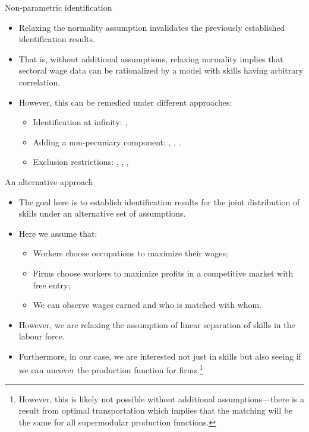 \documentclass{beamer}
\begin{document}
	\begin{frame}{Non-parametric identification}
		\begin{itemize}
			\item Relaxing the normality assumption invalidates the previously established identification results. \citep{heckman1990empirical}
			\smallskip
			\item That is, without additional assumptions, relaxing normality implies that sectoral wage data can be rationalized by a model with skills having arbitrary correlation.
			\smallskip
			\item However, this can be remedied under different approaches:
			\begin{itemize}
				\smallskip
				\item Identification at infinity: \citet{heckman1990empirical} \citet{french2011identification}, \citet{d2013another}
				\smallskip
				\item Adding a non-pecuniary component: \citet{heckman2007econometric} \citet{d2013inference}, \citet{bayer2011nonparametric}, \citet{lee2023nonparametric}.
				\smallskip
				\item Exclusion restrictions: \citet{heckman1990empirical}, \citet{buera2006non}, \citet{french2011identification}, \citet{mourifie2020sharp}
			\end{itemize}
		\end{itemize}
	\end{frame}
	
	\begin{frame}{An alternative approach}
		\begin{itemize}
			\item The goal here is to establish identification results for the joint distribution of skills under an alternative set of assumptions.
			\bigskip
			\item Here we assume that:
			\begin{itemize}
				\item Workers choose occupations to maximize their wages; 
				\item Firms choose workers to maximize profits in a competitive market with free entry;
				\item We can observe wages earned and who is matched with whom.
			\end{itemize}
			\bigskip
			\item However, we are relaxing the assumption of linear separation of skills in the labour force.
			\bigskip
			\item Furthermore, in our case, we are interested not just in skills but also seeing if we can uncover the production function for firms.\footnote{However, this is likely not possible without additional assumptions---there is a result from optimal transportation which implies that the matching will be the same for all supermodular production functions.}
		\end{itemize}
	\end{frame}
	
\end{document}
